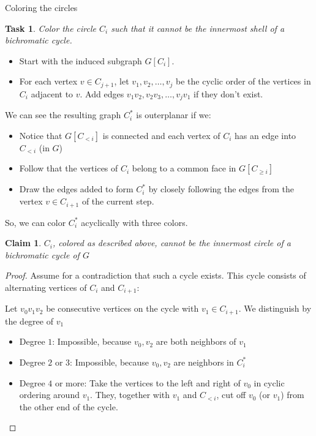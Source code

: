 \documentclass[t]{beamer}
\newtheorem{task}{Task}
\newtheorem{claim}{Claim}
\begin{document}
\begin{frame}{Coloring the circles}
    \begin{task}
	Color the circle $C_i$ such that it cannot be the innermost shell of a bichromatic cycle.
    \end{task}
    \begin{itemize}
	\item Start with the induced subgraph $G[C_i]$. 
	\item For each vertex $v \in C_{j+1}$, let $v_1, v_2, \dots, v_j$ be the cyclic order of the vertices in $C_i$ adjacent to $v$. Add edges $v_1v_2, v_2v_3, \dots, v_jv_1$ if they don't exist. 
    \end{itemize}
    We can see the resulting graph $C_i^*$ is outerplanar if we:
    \begin{itemize}
	\item Notice that $G[C_{<i}]$ is connected and each vertex of $C_i$ has an edge into $C_{<i}$ (in $G$)
	\item Follow that the vertices of $C_i$ belong to a common face in $G[C_{\ge i}]$
	\item Draw the edges added to form $C_i^*$ by closely following the edges from the vertex $v \in C_{i+1}$ of the current step.
    \end{itemize}
    So, we can color $C_i^*$ acyclically with three colors.
\end{frame}

\begin{frame}
    \begin{claim}
	$C_i$, colored as described above, cannot be the innermost circle of a bichromatic cycle of $G$
    \end{claim}
    \begin{proof}
	Assume for a contradiction that such a cycle exists. This cycle consists of alternating vertices of $C_i$ and $C_{i+1}$:

	Let $v_0v_1v_2$ be consecutive vertices on the cycle with $v_1\in C_{i+1}$. We distinguish by the degree of $v_1$
	\begin{itemize}
	    \item Degree $1$: Impossible, because $v_0, v_2$ are both neighbors of $v_1$
	    \item Degree $2$ or $3$: Impossible, because $v_0, v_2$ are neighbors in $C_{i}^*$
	    \item Degree $4$ or more: Take the vertices to the left and right of $v_0$ in cyclic ordering around $v_1$. They, together with $v_1$ and $C_{<i}$, cut off $v_0$ (or $v_1$) from the other end of the cycle. 
	\end{itemize}
    \end{proof}
\end{frame}
\end{document}
